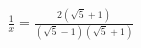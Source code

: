 \documentclass[preview]{standalone}
\begin{document}
\begin{align*}
{\frac{1}{x} = \frac{2(\sqrt{5} + 1 )}{(\sqrt{5} - 1)(\sqrt{5} + 1)}}
\end{align*}
\end{document}
